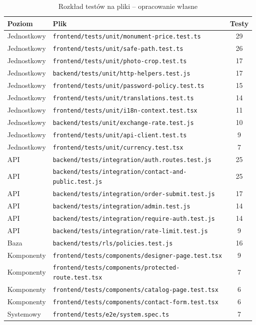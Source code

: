 \begin{table}[htbp]
\centering
\caption{Rozkład testów na pliki -- opracowanie własne}
\label{tab:rozklad-plikow}
\begin{tabular}{|p{}|p{}|c|}
\hline
\textbf{Poziom} & \textbf{Plik} & \textbf{Testy} \\
\hline
Jednostkowy & \texttt{frontend/tests/unit/monument-price.test.ts} & 29 \\
Jednostkowy & \texttt{frontend/tests/unit/safe-path.test.ts} & 26 \\
Jednostkowy & \texttt{frontend/tests/unit/photo-crop.test.ts} & 17 \\
Jednostkowy & \texttt{backend/tests/unit/http-helpers.test.js} & 17 \\
Jednostkowy & \texttt{frontend/tests/unit/password-policy.test.ts} & 15 \\
Jednostkowy & \texttt{frontend/tests/unit/translations.test.ts} & 14 \\
Jednostkowy & \texttt{frontend/tests/unit/i18n-context.test.tsx} & 11 \\
Jednostkowy & \texttt{backend/tests/unit/exchange-rate.test.js} & 10 \\
Jednostkowy & \texttt{frontend/tests/unit/api-client.test.ts} & 9 \\
Jednostkowy & \texttt{frontend/tests/unit/currency.test.tsx} & 7 \\
\hline
API & \texttt{backend/tests/integration/auth.routes.test.js} & 25 \\
API & \texttt{backend/tests/integration/contact-and-public.test.js} & 25 \\
API & \texttt{backend/tests/integration/order-submit.test.js} & 17 \\
API & \texttt{backend/tests/integration/admin.test.js} & 14 \\
API & \texttt{backend/tests/integration/require-auth.test.js} & 14 \\
API & \texttt{backend/tests/integration/rate-limit.test.js} & 9 \\
\hline
Baza & \texttt{backend/tests/rls/policies.test.js} & 16 \\
\hline
Komponenty & \texttt{frontend/tests/components/designer-page.test.tsx} & 9 \\
Komponenty & \texttt{frontend/tests/components/protected-route.test.tsx} & 7 \\
Komponenty & \texttt{frontend/tests/components/catalog-page.test.tsx} & 6 \\
Komponenty & \texttt{frontend/tests/components/contact-form.test.tsx} & 6 \\
\hline
Systemowy & \texttt{frontend/tests/e2e/system.spec.ts} & 7 \\
\hline
\end{tabular}
\end{table}

